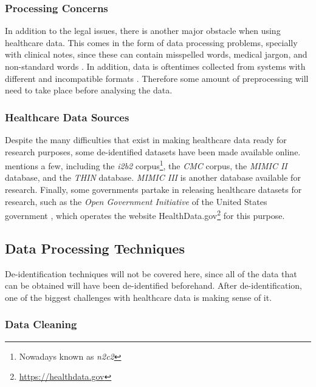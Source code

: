 \documentclass[a4paper,12pt]{article}
\begin{document}
\subsubsection{Processing Concerns}

In addition to the legal issues, there is another major obstacle when using healthcare data.
This comes in the form of data processing problems, specially with clinical notes, since these can contain misspelled words, medical jargon, and non-standard words \parencite{Dalianis2015}.
In addition, data is oftentimes collected from systems with different and incompatible formats \parencite[34]{Consoli2019}.
Therefore some amount of preprocessing will need to take place before analysing the data.


\subsubsection{Healthcare Data Sources}

Despite the many difficulties that exist in making healthcare data ready for research purposes, some de-identified datasets have been made available online.
\textcite{Dalianis2015} mentions a few, including the \textit{i2b2} corpus\footnote{Nowadays known as \textit{n2c2}}, the \textit{CMC} corpus, the \textit{MIMIC II} database, and the \textit{THIN} database. \textit{MIMIC III} \parencite{Johnson2016} is another database available for research.
Finally, some governments partake in releasing healthcare datasets for research, such as the \textit{Open Government Initiative} of the United States government \parencite{Marc2015}, which operates the website HealthData.gov\footnote{\url{https://healthdata.gov}} for this purpose.

\subsection{Data Processing Techniques}

De-identification techniques will not be covered here, since all of the data that can be obtained will have been de-identified beforehand.
After de-identification, one of the biggest challenges with healthcare data is making sense of it.

\subsubsection{Data Cleaning}
\end{document}
